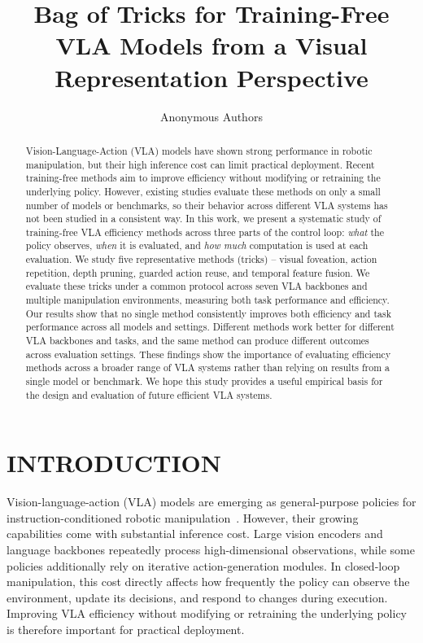 \documentclass[letterpaper, 10 pt, conference]{ieeeconf}
\title{\LARGE \bf
Bag of Tricks for  Training-Free VLA Models from a Visual Representation Perspective
}
\author{Anonymous Authors}
\begin{document}
\maketitle
\thispagestyle{empty}
\pagestyle{empty}

\begin{abstract}

Vision-Language-Action (VLA) models have shown strong performance in robotic manipulation, but their high inference cost can limit practical deployment.
Recent training-free methods aim to improve efficiency without modifying or retraining the underlying policy.
However, existing studies evaluate these methods on only a small number of models or benchmarks, so their behavior across different VLA systems has not been studied in a consistent way.
In this work, we present a systematic study of training-free VLA efficiency methods across three parts of the control loop: \emph{what} the policy observes, \emph{when} it is evaluated, and \emph{how much} computation is used at each evaluation.
We study five representative methods (tricks) -- visual foveation, action repetition, depth pruning, guarded action reuse, and temporal feature fusion.
We evaluate these tricks under a common protocol across seven VLA backbones and multiple manipulation environments, measuring both task performance and efficiency.
Our results show that no single method consistently improves both efficiency and task performance across all models and settings. Different methods work better for different VLA backbones and tasks, and the same method can produce different outcomes across evaluation settings.
These findings show the importance of evaluating efficiency methods across a broader range of VLA systems rather than relying on results from a single model or benchmark.
We hope this study provides a useful empirical basis for the design and evaluation of future efficient VLA systems.

\end{abstract}


\section{INTRODUCTION}

Vision-language-action (VLA) models are emerging as general-purpose policies for instruction-conditioned robotic manipulation~\cite{openvla,spatialvla,univla}. However, their growing capabilities come with substantial inference cost. Large vision encoders and language backbones repeatedly process high-dimensional observations, while some policies additionally rely on iterative action-generation modules. In closed-loop manipulation, this cost directly affects how frequently the policy can observe the environment, update its decisions, and respond to changes during execution. Improving VLA efficiency without modifying or retraining the underlying policy is therefore important for practical deployment.
\end{document}
